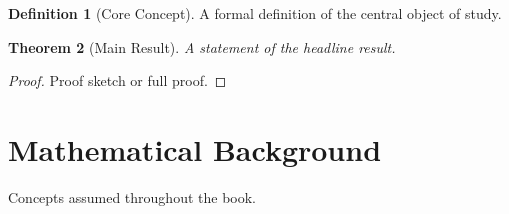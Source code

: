 \documentclass[11pt,twoside,openright]{book}
\theoremstyle{plain}
\newtheorem{theorem}{Theorem}[chapter]
\theoremstyle{definition}
\newtheorem{definition}[theorem]{Definition}
\theoremstyle{remark}
\begin{document}
\begin{definition}[Core Concept]
\label{def:core}
A formal definition of the central object of study.
\end{definition}

\begin{theorem}[Main Result]
\label{thm:main}
A statement of the headline result.
\end{theorem}

\begin{proof}
Proof sketch or full proof.
\end{proof}

% 
% 

\backmatter

\appendix

\chapter{Mathematical Background}
\label{app:math}
Concepts assumed throughout the book.




\printindex
\end{document}
